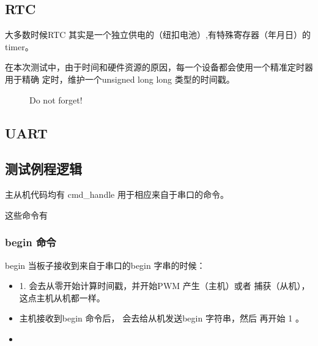 \subsection{RTC}

大多数时候RTC 其实是一个独立供电的（纽扣电池）,有特殊寄存器（年月日）的 timer。

在本次测试中，由于时间和硬件资源的原因，每一个设备都会使用一个精准定时器用于精确
定时，维护一个unsigned long long 类型的时间戳。

\begin{figure}[htbp]
\caption{Do not forget!}
\end{figure}



\subsection{UART}




\subsection{测试例程逻辑}



主从机代码均有 cmd\_handle 用于相应来自于串口的命令。


这些命令有

\subsubsection{begin 命令}

 begin 当板子接收到来自于串口的begin 字串的时候：

 \begin{itemize}
   \item 1. 会去从零开始计算时间戳，并开始PWM 产生（主机）或者 捕获（从机），这点主机从机都一样。

   \item 主机接收到begin 命令后， 会去给从机发送begin 字符串，然后 再开始 1 。

   \item

 \end{itemize}
